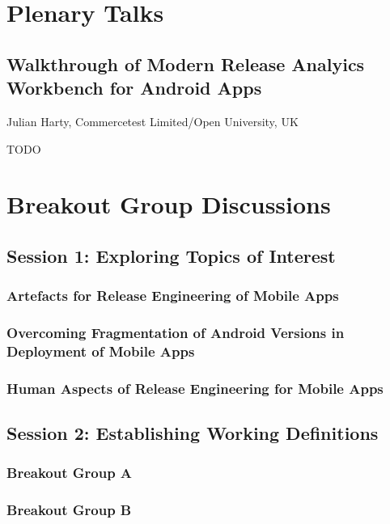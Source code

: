 \documentclass[a4paper]{article}
\begin{document}
\clearpage

\section{Plenary Talks}

\subsection{Walkthrough of Modern Release Analyics Workbench for Android Apps}

Julian Harty, Commercetest Limited/Open University, UK

TODO

\clearpage

\section{Breakout Group Discussions}

\subsection{Session 1: Exploring Topics of Interest}

\subsubsection{Artefacts for Release Engineering of Mobile Apps}

\subsubsection{Overcoming Fragmentation of Android Versions in Deployment of Mobile Apps}

\subsubsection{Human Aspects of Release Engineering for Mobile Apps}

\subsection{Session 2: Establishing Working Definitions}

\subsubsection{Breakout Group A}

\subsubsection{Breakout Group B}
\end{document}
